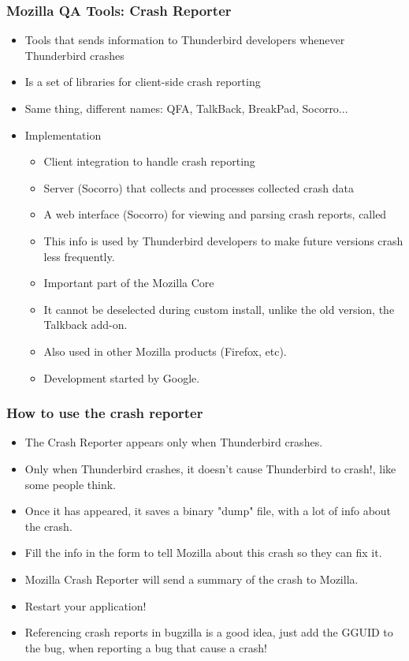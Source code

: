 \documentclass{beamer}
\begin{document}
\begin{frame}
 \frametitle{Mozilla QA Tools: Crash Reporter}
 \begin{itemize}
 \item Tools that sends information to Thunderbird developers whenever Thunderbird crashes
 \item Is a set of libraries for client-side crash reporting
 \item Same thing, different names: QFA, TalkBack, BreakPad, Socorro...
 \item Implementation
    \begin{itemize}
        \item Client integration to handle crash reporting 
        \item Server (Socorro) that collects and processes collected crash data
        \item A web interface (Socorro) for viewing and parsing crash reports, called
        \item This info is used by Thunderbird developers to make future versions crash less frequently. 
        \item Important part of the Mozilla Core
        \item It cannot be deselected during custom install, unlike the old version, the Talkback add-on.
        \item Also used in other Mozilla products (Firefox, etc).
        \item Development started by Google.
    \end{itemize}
 \end{itemize}
\end{frame}


\begin{frame}
 \frametitle{How to use the crash reporter}
 \begin{itemize}
  \item The Crash Reporter appears only when Thunderbird crashes.
  \item Only when Thunderbird crashes, it doesn't cause Thunderbird to crash!, like some people think.
  \item Once it has appeared, it saves a binary "dump" file, with a lot of info about the crash.
  \item Fill the info in the form to tell Mozilla about this crash so they can fix it.
  \item Mozilla Crash Reporter will send a summary of the crash to Mozilla.
  \item Restart your application!
  \item Referencing crash reports in bugzilla is a good idea, just add the GGUID to the bug, when reporting a bug that cause a crash!
 \end{itemize}
\end{frame}
\end{document}
